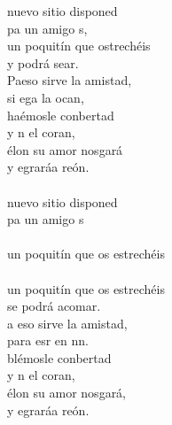 \begin{cancion}%
	nuevo sitio disponed\\
	pa un amigo s,\\
	un poquitín que ostrechéis\\
	y podrá sear.\\
	Paeso sirve la amistad,\\
	si ega la ocan, \\
	haémosle conbertad\\
	y n el coran,\\
	élon su amor nosgará\\
	y egraráa reón.\\
	\jump\\
	nuevo sitio disponed\\
	pa un amigo s\\
	\jump\\
un poquitín que os estrechéis\\
	\jump\\
un poquitín que os estrechéis\\
	se podrá acomar.\\
	a eso sirve la amistad,\\
	para esr en nn.\\
	blémosle conbertad\\
	y n el coran,\\
	élon su amor nosgará,\\
	y egraráa reón.\\
\end{cancion}%
